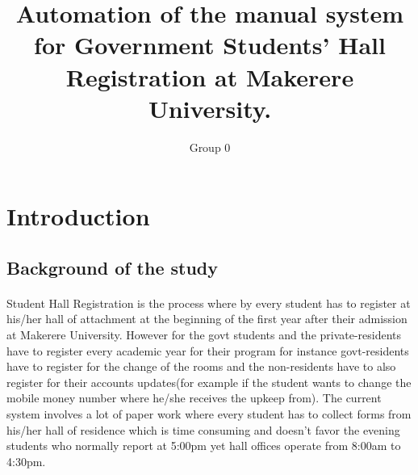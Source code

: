 \documentclass[12pt]{article}
\begin{document}
	\title{Automation of the manual system for Government Students’ Hall Registration at Makerere University.}
	
	\author{Group 0}
	
	\maketitle
	\section{Introduction}
	\subsection{Background of the study}
	\paragraph{}
	Student Hall Registration is the process where by every student has to register at his/her hall of attachment at the beginning of the first year after their admission at Makerere University.
	However for the govt students and the private-residents have to register every academic year for their program for instance govt-residents have to register for the change of the rooms and the non-residents have to also register for their accounts updates(for example if the student wants to change the mobile money number where he/she receives the upkeep from).
	The current system involves a lot of paper work where every student has to collect forms from his/her hall of residence which is time consuming and  doesn't favor the evening students who normally report at 5:00pm yet hall offices operate from 8:00am  to 4:30pm. 
	

	
	
\end{document}
